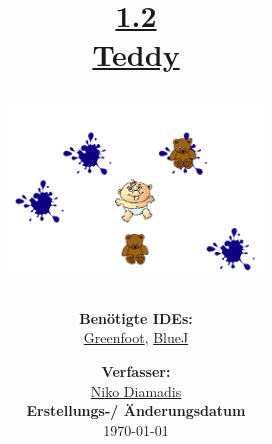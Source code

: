 \documentclass{scrartcl}   %
\begin{document}
\title{\huge{\href{https://www.inf-schule.de/programmierung/oopjava/klassen/aufbau}{1.2\\Teddy}}\\
\vspace{0.5cm}
\begin{figure}[ht]
	\centering
	\includegraphics[height=4.5cm]{Teddy.png}
\end{figure}
\vspace{2cm}}

\author{\textbf{Benötigte IDEs:}\\
\href{https://www.greenfoot.org/}{Greenfoot}, \href{https://www.bluej.org/}{BlueJ}
\vspace{2cm}}

\date{\textbf{Verfasser:}\\
\href{https://nikothegreek.jimdofree.com/}{Niko Diamadis}\\
\vspace{0.5cm}
\textbf{Erstellungs-/ Änderungsdatum}\\
\today\enlargethispage{4cm}}

\doublespacing

\maketitle\thispagestyle{empty}

\cleardoublepage

\setcounter{page}{1}
\tableofcontents


\newpage
{}  %
\end{document}
